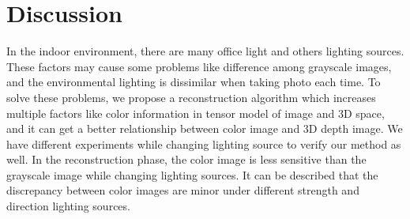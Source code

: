 \section{Discussion}

In the indoor environment, there are many office light and others lighting sources. 
These factors may cause some problems like difference among grayscale images, and the environmental lighting is dissimilar when taking photo each time. 
To solve these problems, we propose a reconstruction algorithm which increases multiple factors like color information in tensor model of image and 3D space, and it can get a better relationship between color image and 3D depth image. 
We have different experiments while changing lighting source to verify our method as well. 
In the reconstruction phase, the color image is less sensitive than the grayscale image while changing lighting sources. 
It can be described that the discrepancy between color images are minor under different strength and direction lighting sources. 


